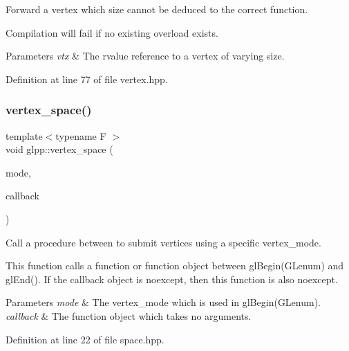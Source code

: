 Forward a vertex which size cannot be deduced to the correct function. 

Compilation will fail if no existing overload exists.


\begin{DoxyParams}{Parameters}
{\em vtx} & The rvalue reference to a vertex of varying size. \\
\hline
\end{DoxyParams}


Definition at line 77 of file vertex.\+hpp.

\mbox{\label{namespaceglpp_aa7cbd5b1825d6cd9783bc1004a5f0bde}} 
\subsubsection{\texorpdfstring{vertex\+\_\+space()}{vertex\_space()}}
{\footnotesize\ttfamily template$<$typename F $>$ \\
void glpp\+::vertex\+\_\+space (\begin{DoxyParamCaption}\item[{\hyperlink{namespaceglpp_a3d4cc897229caf80f6712debc078a265}{vertex\+\_\+mode}}]{mode,  }\item[{F}]{callback }\end{DoxyParamCaption})\hspace{0.3cm}{\ttfamily [noexcept]}}



Call a procedure between to submit vertices using a specific vertex\+\_\+mode. 

This function calls a function or function object between gl\+Begin(\+G\+Lenum) and gl\+End(). If the callback object is {\ttfamily noexcept}, then this function is also {\ttfamily noexcept}.


\begin{DoxyParams}{Parameters}
{\em mode} & The vertex\+\_\+mode which is used in gl\+Begin(\+G\+Lenum). \\
\hline
{\em callback} & The function object which takes no arguments. \\
\hline
\end{DoxyParams}


Definition at line 22 of file space.\+hpp.

